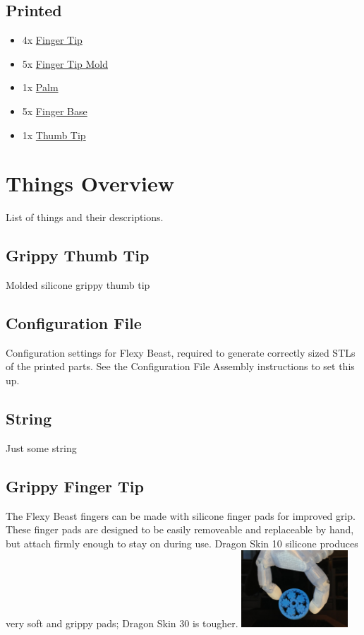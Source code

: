 \documentclass[11pt]{article}
\begin{document}
\subsection{Printed}
\begin{itemize}
\item 4x \hyperlink{thing_finger\_tip}{Finger Tip}
\item 5x \hyperlink{thing_finger\_tip\_mold}{Finger Tip Mold}
\item 1x \hyperlink{thing_palm}{Palm}
\item 5x \hyperlink{thing_finger\_base}{Finger Base}
\item 1x \hyperlink{thing_thumb\_tip}{Thumb Tip}
\end{itemize}

\newpage

\section{Things Overview}
List of things and their descriptions.

\hypertarget{thing_thumb\_tip\_grip}{\subsection{Grippy Thumb Tip}}
Molded silicone grippy thumb tip

\hypertarget{thing_config\_file}{\subsection{Configuration File}}
Configuration settings for Flexy Beast, required to generate correctly sized STLs of the printed parts. See the Configuration File Assembly instructions to set this up.

\hypertarget{thing_string}{\subsection{String}}
Just some string

\hypertarget{thing_finger\_tip\_grip}{\subsection{Grippy Finger Tip}}
The Flexy Beast fingers can be made with silicone finger pads for improved grip. These finger pads are designed to be easily removeable and replaceable by hand, but attach firmly enough to stay on during use. Dragon Skin 10 silicone produces very soft and grippy pads; Dragon Skin 30 is tougher.
\includegraphics[width=4cm]{images/finger_tip_grip.jpg}
\end{document}
